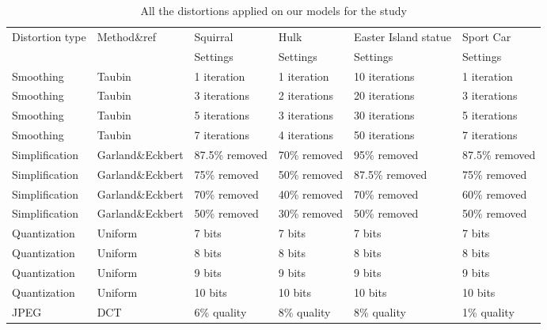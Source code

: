 \begin{table}[]
\centering
\caption{All the distortions applied on our models for the study}
\label{my-label}
\begin{tabular}{llllll}
Distortion type & Method\&ref            & Squirral       & Hulk         & Easter Island statue & Sport Car      \\
                &                        & Settings       & Settings     & Settings             & Settings       \\
Smoothing       & Taubin              & 1 iteration    & 1 iteration  & 10 iterations        & 1 iteration    \\
Smoothing       & Taubin              & 3 iterations   & 2 iterations & 20 iterations        & 3 iterations   \\
Smoothing       & Taubin              & 5 iterations   & 3 iterations & 30 iterations        & 5 iterations   \\
Smoothing       & Taubin              & 7 iterations   & 4 iterations & 50 iterations        & 7 iterations   \\
Simplification  & Garland\&Eckbert \cite{Garland_1997}       & 87.5\% removed & 70\% removed & 95\% removed         & 87.5\% removed \\
Simplification  & Garland\&Eckbert \cite{Garland_1997}       & 75\% removed   & 50\% removed & 87.5\% removed       & 75\% removed   \\
Simplification  & Garland\&Eckbert \cite{Garland_1997}        & 70\% removed   & 40\% removed & 70\% removed         & 60\% removed   \\
Simplification  & Garland\&Eckbert \cite{Garland_1997}       & 50\% removed   & 30\% removed & 50\% removed         & 50\% removed   \\
Quantization    & Uniform                & 7 bits         & 7 bits       & 7 bits               & 7 bits         \\
Quantization    & Uniform                & 8 bits         & 8 bits       & 8 bits               & 8 bits         \\
Quantization    & Uniform                & 9 bits         & 9 bits       & 9 bits               & 9 bits         \\
Quantization    & Uniform                & 10 bits        & 10 bits      & 10 bits              & 10 bits        \\
JPEG            & DCT                    & 6\% quality    & 8\% quality  & 8\% quality          & 1\% quality    \\

\end{tabular}
\end{table}
